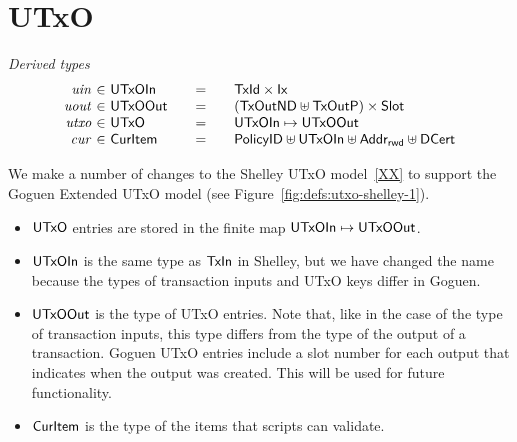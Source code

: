 \section{UTxO}
\label{sec:utxo}


\begin{figure*}[htb]
  \emph{Derived types}
  \begin{equation*}
    \begin{array}{r@{~\in~}l@{\qquad=\qquad}lr}
      \var{uin}
      & \UTxOIn
      & \TxId \times \Ix
      \\
      \var{uout}
      & \UTxOOut
      & (\TxOutND \uniondistinct \TxOutP) \times \Slot
      \\
      \var{utxo}
      & \UTxO
      & \UTxOIn \mapsto \UTxOOut
      \\
      \var{cur}
      & \CurItem
      & \PolicyID \uniondistinct \UTxOIn \uniondistinct \AddrRWD \uniondistinct \DCert
    \end{array}
  \end{equation*}
  \caption{Definitions used in the UTxO transition system}
  \label{fig:defs:utxo-shelley-1}
\end{figure*}


We make a number of changes to the Shelley UTxO model~\ref{XX} to support the Goguen Extended UTxO model
(see Figure~\ref{fig:defs:utxo-shelley-1}).

\begin{itemize}
\item
  $\mathsf{UTxO}$ entries are stored in the finite map $\mathsf{UTxOIn}\mapsto \mathsf{UTxOOut}$.

\item
  $\mathsf{UTxOIn}$ is the same type as $\mathsf{TxIn}$ in Shelley, but we have changed
  the name because the types of transaction inputs and UTxO keys
  differ in Goguen.

\item
  $\mathsf{UTxOOut}$ is the type of UTxO entries.
  Note that, like in the case of the type of transaction inputs,
  this type differs from the type of the output of a transaction.
  Goguen UTxO entries include a slot number for each output
  that indicates when the output was created.
  This will be used for future functionality.

\item
  $\mathsf{CurItem}$ is the type of the items that scripts can validate.

\end{itemize}

